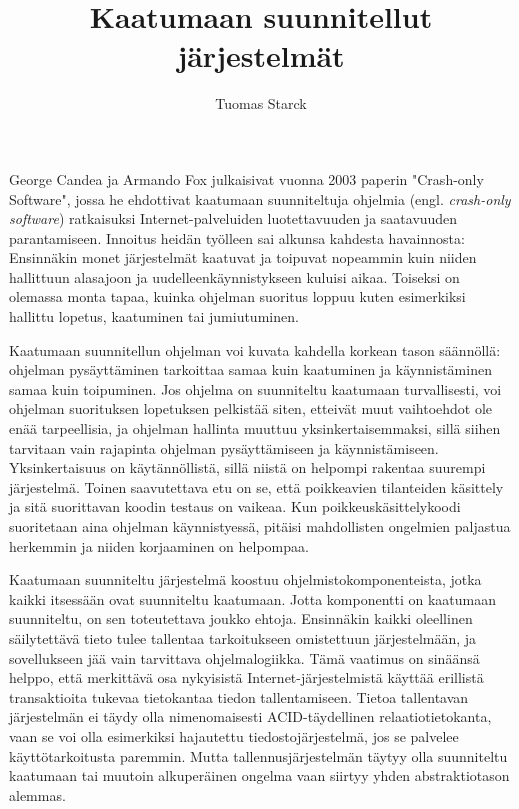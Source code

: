 \documentclass[a4paper,12pt]{article}
\begin{document}
\title{Kaatumaan suunnitellut järjestelmät}
\author{Tuomas Starck}
\maketitle

\vspace{5.5em}

George Candea ja Armando Fox julkaisivat vuonna 2003 paperin "Crash-only Software"\cite{cos}, jossa he ehdottivat kaatumaan suunniteltuja oh\-jel\-mi\-a (engl. \emph{crash-only software}) ratkaisuksi Internet-palveluiden luotettavuuden ja saatavuuden parantamiseen. Innoitus heidän työlleen sai alkunsa kahdesta havainnosta: Ensinnäkin monet järjestelmät kaatuvat ja toipuvat nopeammin kuin niiden hallittuun alasajoon ja uudelleenkäynnistykseen kuluisi aikaa. Toiseksi on olemassa monta tapaa, kuinka ohjelman suoritus loppuu kuten esimerkiksi hallittu lopetus, kaatuminen tai jumiutuminen.

Kaatumaan suunnitellun ohjelman voi kuvata kahdella korkean tason säännöllä: ohjelman pysäyttäminen tarkoittaa samaa kuin kaatuminen ja käynnistäminen samaa kuin toipuminen. Jos ohjelma on suunniteltu kaatumaan turvallisesti, voi ohjelman suorituksen lopetuksen pelkistää siten, etteivät muut vaihtoehdot ole enää tarpeellisia, ja ohjelman hallinta muuttuu yksinkertaisemmaksi, sillä siihen tarvitaan vain rajapinta ohjelman py\-säyt\-tä\-mi\-seen ja käynnistämiseen. Yksinkertaisuus on käytännöllistä, sillä niistä on helpompi rakentaa suurempi järjestelmä. Toinen saavutettava etu on se, että poikkeavien tilanteiden käsittely ja sitä suorittavan koodin testaus on vaikeaa. Kun poikkeuskäsittelykoodi suoritetaan aina ohjelman käynnistyessä, pitäisi mahdollisten ongelmien paljastua herkemmin ja niiden korjaaminen on helpompaa.

Kaatumaan suunniteltu järjestelmä koostuu ohjelmistokomponenteista, jotka kaikki itsessään ovat suunniteltu kaatumaan. Jotta komponentti on kaatumaan suunniteltu, on sen toteutettava joukko ehtoja. Ensinnäkin kaikki oleellinen säilytettävä tieto tulee tallentaa tarkoitukseen omistettuun jär\-jes\-tel\-mään, ja sovellukseen jää vain tarvittava ohjelmalogiikka. Tämä vaatimus on sinäänsä helppo, että merkittävä osa nykyisistä Internet-järjestelmistä käyttää erillistä transaktioita tukevaa tietokantaa tiedon tallentamiseen. Tietoa tallentavan järjestelmän ei täydy olla nimenomaisesti ACID-täydellinen relaatiotietokanta, vaan se voi olla esimerkiksi hajautettu tiedostojärjestelmä, jos se palvelee käyttötarkoitusta paremmin. Mutta tallennusjärjestelmän täytyy olla suunniteltu kaatumaan tai muutoin alkuperäinen ongelma vaan siirtyy yhden abstraktiotason alemmas.
\end{document}
